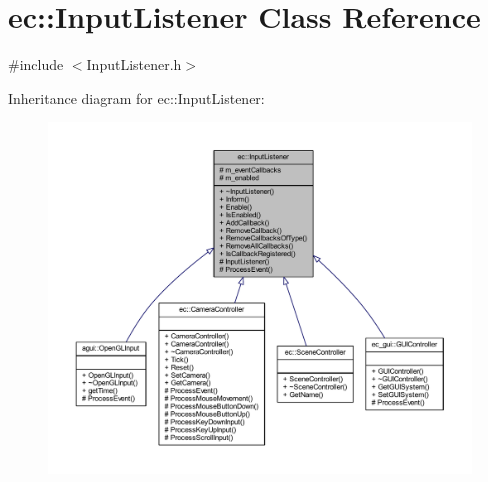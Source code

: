 \hypertarget{classec_1_1_input_listener}{}\section{ec\+:\+:Input\+Listener Class Reference}
\label{classec_1_1_input_listener}


{\ttfamily \#include $<$Input\+Listener.\+h$>$}



Inheritance diagram for ec\+:\+:Input\+Listener\+:
\nopagebreak
\begin{figure}[H]
\begin{center}
\leavevmode
\includegraphics[width=350pt]{classec_1_1_input_listener__inherit__graph}
\end{center}
\end{figure}


